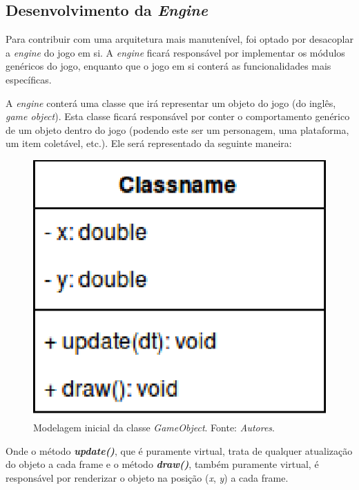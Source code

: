   \subsection{Desenvolvimento da \textit{Engine}}

    Para contribuir com uma arquitetura mais manutenível, foi optado por desacoplar a \textit{engine} do jogo em si. A \textit{engine} ficará responsável por implementar os módulos genéricos do jogo, enquanto que o jogo em si conterá as funcionalidades mais específicas.

    A \textit{engine} conterá uma classe que irá representar um objeto do jogo (do inglês, \textit{game object}). Esta classe ficará responsável por conter o comportamento genérico de um objeto dentro do jogo (podendo este ser um personagem, uma plataforma, um item coletável, etc.). Ele será representado da seguinte maneira:

    \vspace{\onelineskip}

    \begin{figure}[H]
      \centering \includegraphics[keepaspectratio=true,scale=0.6]{figuras/game-object.eps}
      \caption[Modelagem inicial da classe \textit{GameObject}]
        {Modelagem inicial da classe \textit{GameObject}. Fonte: \textit{Autores}.}
      \label{game-object}
    \end{figure}

    Onde o método \textbf{\textit{update()}}, que é puramente virtual, trata de qualquer atualização do objeto a cada frame e o método \textbf{\textit{draw()}}, também puramente virtual, é responsável por renderizar o objeto na posição (\textit{x}, \textit{y}) a cada frame.

